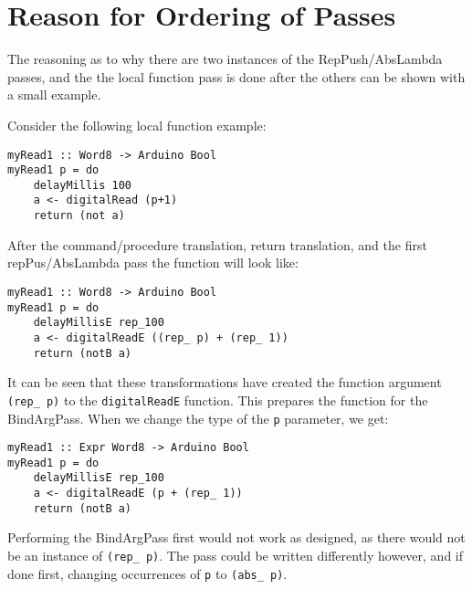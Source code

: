 \documentclass[11pt, oneside]{article}   	%
\begin{document}
\section{Reason for Ordering of Passes}

The reasoning as to why there are two instances of the RepPush/AbsLambda passes, 
and the the local function pass is done after the others can be shown with a
small example.  

Consider the following local function example:

\begin{verbatim}
myRead1 :: Word8 -> Arduino Bool
myRead1 p = do
    delayMillis 100
    a <- digitalRead (p+1)
    return (not a)
\end{verbatim}

After the command/procedure translation, return translation, and the first
repPus/AbsLambda pass the function will look like:

\begin{verbatim}
myRead1 :: Word8 -> Arduino Bool
myRead1 p = do
    delayMillisE rep_100
    a <- digitalReadE ((rep_ p) + (rep_ 1))
    return (notB a)
\end{verbatim}

It can be seen that these transformations have created the function argument
\verb+(rep_ p)+ to the \verb+digitalReadE+ function.  This prepares the function for the
BindArgPass.  When we change the type of the \verb+p+ parameter, we get:

\begin{verbatim}
myRead1 :: Expr Word8 -> Arduino Bool
myRead1 p = do
    delayMillisE rep_100
    a <- digitalReadE (p + (rep_ 1))
    return (notB a)
\end{verbatim}

Performing the BindArgPass first would not work as designed, as there would
not be an instance of \verb+(rep_ p)+.  The pass could be written differently
however, and if done first, changing occurrences of \verb+p+ to \verb+(abs_ p)+.
\end{document}

